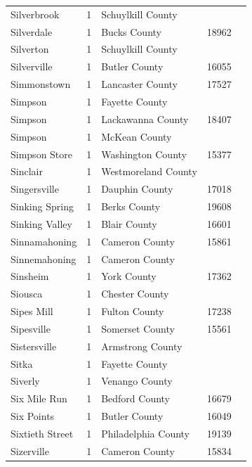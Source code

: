 \documentclass{article}
\begin{document}
\begin{tabular}{lllll}
Silverbrook & 1 & Schuylkill County &  &  \\
Silverdale & 1 & Bucks County & 18962 &  \\
Silverton & 1 & Schuylkill County &  &  \\
Silverville & 1 & Butler County & 16055 &  \\
Simmonstown & 1 & Lancaster County & 17527 &  \\
Simpson & 1 & Fayette County &  &  \\
Simpson & 1 & Lackawanna County & 18407 &  \\
Simpson & 1 & McKean County &  &  \\
Simpson Store & 1 & Washington County & 15377 &  \\
Sinclair & 1 & Westmoreland County &  &  \\
Singersville & 1 & Dauphin County & 17018 &  \\
Sinking Spring & 1 & Berks County & 19608 &  \\
Sinking Valley & 1 & Blair County & 16601 &  \\
Sinnamahoning & 1 & Cameron County & 15861 &  \\
Sinnemahoning & 1 & Cameron County &  &  \\
Sinsheim & 1 & York County & 17362 &  \\
Siousca & 1 & Chester County &  &  \\
Sipes Mill & 1 & Fulton County & 17238 &  \\
Sipesville & 1 & Somerset County & 15561 &  \\
Sistersville & 1 & Armstrong County &  &  \\
Sitka & 1 & Fayette County &  &  \\
Siverly & 1 & Venango County &  &  \\
Six Mile Run & 1 & Bedford County & 16679 &  \\
Six Points & 1 & Butler County & 16049 &  \\
Sixtieth Street & 1 & Philadelphia County & 19139 &  \\
Sizerville & 1 & Cameron County & 15834 &  \\
\bottomrule
\end{tabular}
\end{document}
